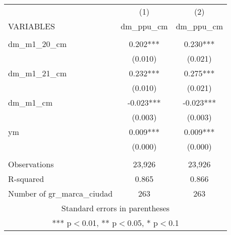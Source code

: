 \begin{tabular}{lcc} \hline
 & (1) & (2) \\
VARIABLES & dm\_ppu\_cm & dm\_ppu\_cm \\ \hline
 &  &  \\
dm\_m1\_20\_cm & 0.202*** & 0.230*** \\
 & (0.010) & (0.021) \\
dm\_m1\_21\_cm & 0.232*** & 0.275*** \\
 & (0.010) & (0.021) \\
dm\_m1\_cm & -0.023*** & -0.023*** \\
 & (0.003) & (0.003) \\
ym & 0.009*** & 0.009*** \\
 & (0.000) & (0.000) \\
 &  &  \\
Observations & 23,926 & 23,926 \\
R-squared & 0.865 & 0.866 \\
 Number of gr\_marca\_ciudad & 263 & 263 \\ \hline
\multicolumn{3}{c}{ Standard errors in parentheses} \\
\multicolumn{3}{c}{ *** p$<$0.01, ** p$<$0.05, * p$<$0.1} \\
\end{tabular}
